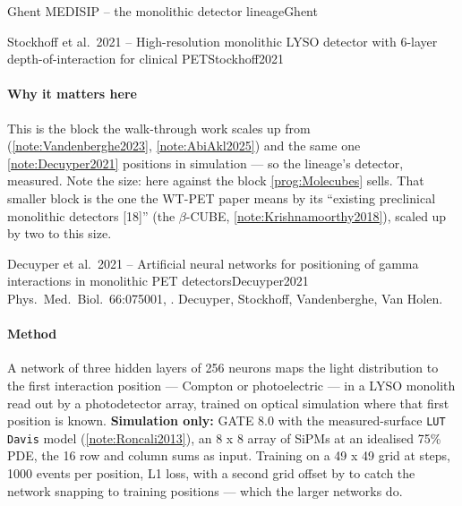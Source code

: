 \begin{programnote}{Ghent MEDISIP -- the monolithic detector lineage}{Ghent}
\begin{papernote}{Stockhoff et al.\ 2021 -- High-resolution monolithic LYSO detector with 6-layer depth-of-interaction for clinical PET}{Stockhoff2021}
\paragraph{Why it matters here}
This is the block the walk-through work scales up from
(\ref{note:Vandenberghe2023}, \ref{note:AbiAkl2025}) and the same one
\ref{note:Decuyper2021} positions in simulation --- so the lineage's
detector, measured. Note the size:  here
against the  block
\ref{prog:Molecubes} sells. That smaller block is the one the WT-PET paper
means by its ``existing preclinical monolithic detectors [18]'' (the
$\beta$-CUBE, \ref{note:Krishnamoorthy2018}), scaled up by two to this size.

\end{papernote}

\begin{papernote}{Decuyper et al.\ 2021 -- Artificial neural networks for positioning of gamma interactions in monolithic PET detectors}{Decuyper2021}
Phys.\ Med.\ Biol.\ 66:075001, . Decuyper,
Stockhoff, Vandenberghe, Van Holen.

\paragraph{Method}
A network of three hidden layers of 256 neurons maps the light distribution to
the first interaction position --- Compton or photoelectric --- in a
 LYSO monolith read out by a photodetector
array, trained on optical simulation where that first position is known.
\textbf{Simulation only:} GATE 8.0 with the measured-surface \texttt{LUT
Davis} model (\ref{note:Roncali2013}), an 8 x 8 array of  SiPMs
at an idealised 75\% PDE, the 16 row and column sums as input. Training on a
49 x 49 grid at  steps, 1000 events per position, L1 loss, with a
second grid offset by  to catch the network snapping to training
positions --- which the larger networks do.


\end{papernote}
\end{programnote}
